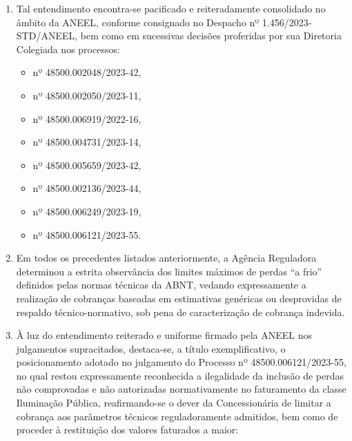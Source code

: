 \begin{enumerate}[resume]
\item 
Tal entendimento encontra-se pacificado e reiteradamente consolidado no âmbito da ANEEL, conforme consignado no Despacho nº 1.456/2023-STD/ANEEL, bem como em sucessivas decisões proferidas por sua Diretoria Colegiada nos processos:
\begin{itemize}
\item nº 48500.002048/2023-42, 
\item nº 48500.002050/2023-11, 
\item nº 48500.006919/2022-16, 
\item nº 48500.004731/2023-14, 
\item nº 48500.005659/2023-42, 
\item nº 48500.002136/2023-44,
\item nº 48500.006249/2023-19,
\item nº 48500.006121/2023-55.
\end{itemize}

\item 
Em todos os precedentes listados anteriormente, a Agência Reguladora determinou a estrita observância dos limites máximos de perdas “a frio” definidos pelas normas técnicas da ABNT, vedando expressamente a realização de cobranças baseadas em estimativas genéricas ou desprovidas de respaldo técnico-normativo, sob pena de caracterização de cobrança indevida.

\item
À luz do entendimento reiterado e uniforme firmado pela ANEEL nos julgamentos supracitados, destaca-se, a título exemplificativo, o posicionamento adotado no julgamento do Processo nº 48500.006121/2023-55, no qual restou expressamente reconhecida a ilegalidade da inclusão de perdas não comprovadas e não autorizadas normativamente no faturamento da classe Iluminação Pública, reafirmando-se o dever da Concessionária de limitar a cobrança aos parâmetros técnicos reguladoramente admitidos, bem como de proceder à restituição dos valores faturados a maior:

\end{enumerate}
